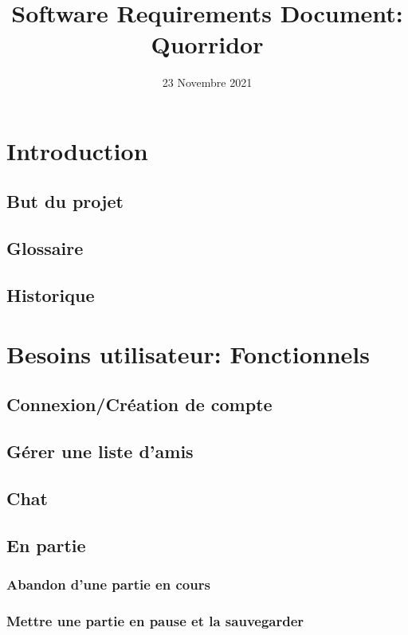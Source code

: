 \documentclass[utf8]{article}
\title{Software Requirements Document: \\ Quorridor}
\author{}
\date{23 Novembre 2021}
\begin{document}
\maketitle
\newpage
\tableofcontents

\newpage

\section{Introduction}
  \subsection{But du projet}
  \subsection{Glossaire}
  \subsection{Historique}


\section{Besoins utilisateur: Fonctionnels}
  \subsection{Connexion/Création de compte}
  \subsection{Gérer une liste d'amis}
  \subsection{Chat}
  \subsection{En partie}
    \subsubsection{Abandon d'une partie en cours}
    \subsubsection{Mettre une partie en pause et la sauvegarder}
\end{document}
